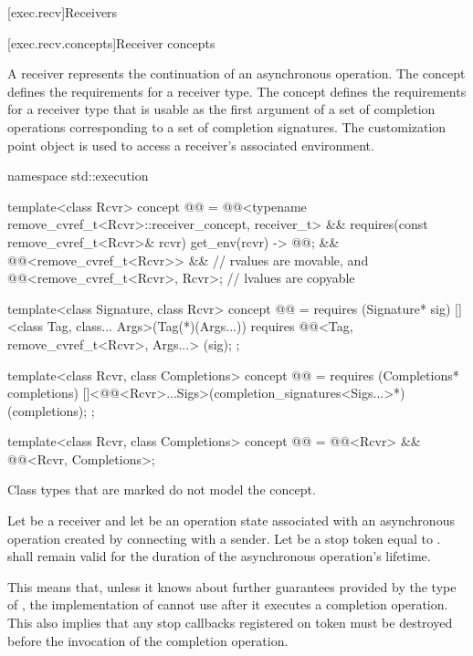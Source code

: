 [exec.recv]{Receivers}

[exec.recv.concepts]{Receiver concepts}

\pnum
A receiver represents the continuation of an asynchronous operation.
The  concept defines
the requirements for a receiver type.
The  concept defines
the requirements for a receiver type that is usable as
the first argument of a set of completion operations
corresponding to a set of completion signatures.
The  customization point object is used to access
a receiver's associated environment.
\begin{codeblock}
namespace std::execution {
  template<class Rcvr>
    concept @@ =
      @@<typename remove_cvref_t<Rcvr>::receiver_concept, receiver_t> &&
      requires(const remove_cvref_t<Rcvr>& rcvr) {
        { get_env(rcvr) } -> @@;
      } &&
      @@<remove_cvref_t<Rcvr>> &&       // rvalues are movable, and
      @@<remove_cvref_t<Rcvr>, Rcvr>;   // lvalues are copyable

  template<class Signature, class Rcvr>
    concept @@ =
      requires (Signature* sig) {
        []<class Tag, class... Args>(Tag(*)(Args...))
            requires @@<Tag, remove_cvref_t<Rcvr>, Args...>
        {}(sig);
      };

  template<class Rcvr, class Completions>
    concept @@ =
      requires (Completions* completions) {
        []<@@<Rcvr>...Sigs>(completion_signatures<Sigs...>*)
        {}(completions);
      };

  template<class Rcvr, class Completions>
    concept @@ =
      @@<Rcvr> && @@<Rcvr, Completions>;
}
\end{codeblock}

\pnum
Class types that are marked  do not model the  concept.

\pnum
Let  be a receiver and
let  be an operation state associated with
an asynchronous operation created by connecting  with a sender.
Let  be a stop token equal to
.
 shall remain valid
for the duration of the asynchronous operation's lifetime.
\begin{note}
This means that, unless it knows about further guarantees
provided by the type of ,
the implementation of  cannot use 
after it executes a completion operation.
This also implies that any stop callbacks registered on token
must be destroyed before the invocation of the completion operation.
\end{note}

